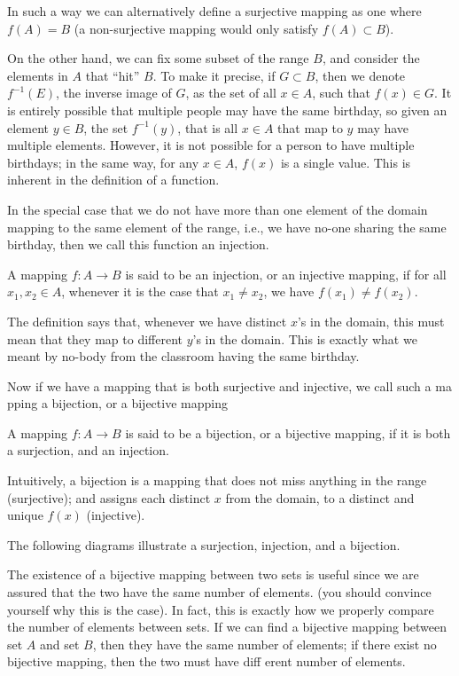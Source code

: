\documentclass[../../templates/section]{subfiles}
\begin{document}
In such a way we can alternatively define a surjective mapping as one where
$f(A) = B$ (a non-surjective mapping would only satisfy $f(A) \subset B$).

On the other hand, we can fix some subset of the range $B$, and consider the
elements in $A$ that ``hit'' $B$. To make it precise, if $G \subset B$, then we
denote $f^{-1}(E)$, the inverse image of $G$, as the set of all $x\in A$, such
that $f(x)\in G$. It is entirely possible that multiple people may have the
same birthday, so given an element $y\in B$, the set $f^{-1}(y)$, that is all
$x\in A$ that map to $y$ may have multiple elements. However, it is not
possible for a person to have multiple birthdays; in the same way, for any
$x\in A$, $f(x)$ is a single value. This is inherent in the definition of a
function.

In the special case that we do not have more than one element of the domain 
mapping to the same element of the range, i.e., we have no-one sharing the same
birthday, then we call this function an injection.

\begin{definition}
A mapping $f:A\to B$ is said to be an injection, or an injective
mapping, if for all $x_1, x_2 \in A$, whenever it is the case that $x_1\neq
x_2$, we have $f(x_1) \neq f(x_2)$.
\end{definition}

The definition says that, whenever we have distinct $x$'s in the domain, this
must mean that they map to different $y$'s in the domain. This is exactly what
we meant by no-body from the classroom having the same birthday.

Now if we have a mapping that is both surjective and injective, we call such a
ma pping a bijection, or a bijective mapping

\begin{definition}
A mapping $f:A\to B$ is said to be a bijection, or a bijective mapping,
if it is both a surjection, and an injection.
\end{definition} 

Intuitively, a bijection is a mapping that does not miss anything in the range
(surjective); and assigns each distinct $x$ from the domain, to a distinct and
unique $f(x)$ (injective). 

The following diagrams illustrate a surjection, injection, and a bijection.

The existence of a bijective mapping between two sets is useful since we are
assured that the two have the same number of elements.  (you should convince
yourself why this is the case). In fact, this is exactly how we properly
compare the number of elements between sets. If we can find a bijective mapping
between set $A$ and set $B$, then they have the same number of elements; if
there exist no bijective mapping, then the two must have diff erent number of
elements. 
\end{document}
